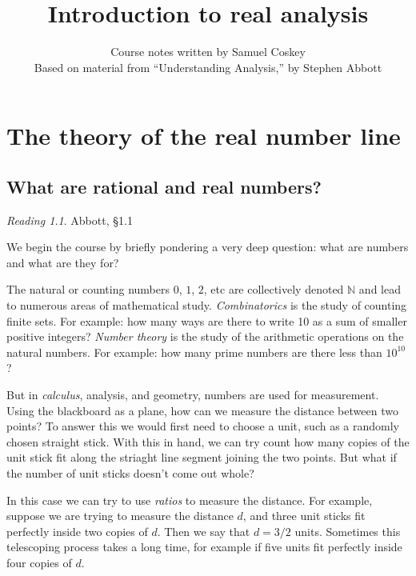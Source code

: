 \documentclass[11pt,oneside]{amsbook}
\title{Introduction to real analysis}
\author{Course notes written by Samuel Coskey\\Based on material from ``Understanding Analysis,'' by Stephen Abbott}
\newcommand{\NN}{\mathbb N}
\theoremstyle{definition}
\theoremstyle{plain}
\theoremstyle{definition}
\theoremstyle{remark}
\newtheorem*{reading}{Reading}
\numberwithin{equation}{section}
\numberwithin{figure}{section}
\begin{document}
\maketitle

\tableofcontents

\chapter{The theory of the real number line}

\section{What are rational and real numbers?}

\begin{reading}
  Abbott, \S 1.1
\end{reading}


We begin the course by briefly pondering a very deep question: what are numbers and what are they for?

The natural or counting numbers $0$, $1$, $2$, etc are collectively denoted $\NN$ and lead to numerous areas of mathematical study. \emph{Combinatorics} is the study of counting finite sets. For example: how many ways are there to write 10 as a sum of smaller positive integers? \emph{Number theory} is the study of the arithmetic operations on the natural numbers. For example: how many prime numbers are there less than $10^{10}$?

But in \emph{calculus}, analysis, and geometry, numbers are used for measurement. Using the blackboard as a plane, how can we measure the distance between two points? To answer this we would first need to choose a unit, such as a randomly chosen straight stick. With this in hand, we can try count how many copies of the unit stick fit along the striaght line segment joining the two points. But what if the number of unit sticks doesn't come out whole?

In this case we can try to use \emph{ratios} to measure the distance. For example, suppose we are trying to measure the distance $d$, and three unit sticks fit perfectly inside two copies of $d$. Then we say that $d=3/2$ units. Sometimes this telescoping process takes a long time, for example if five units fit perfectly inside four copies of $d$.
\end{document}
